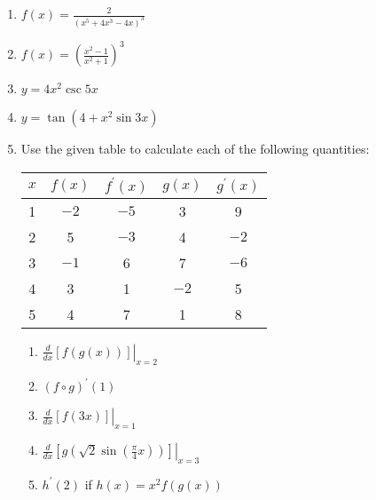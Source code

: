 \documentclass[12pt]{article}
\newif\ifans
\begin{document}
\begin{enumerate}
\item $f(x) = \frac{2}{(x^5+4x^3-4x)^3}$ 

\ifans{\fbox{$\frac{-6(5x^4+12x^2-4)}{(x^5+4x^3-4x)^4}$}} \fi

\item $f(x) = \left(\frac{x^2-1}{x^2+1}\right)^3$ 

\ifans{\fbox{$\frac{12x(x^2-1)^2}{(x^2+1)^4}$}} \fi

\item $y=4x^2\csc{5x}$

\ifans{\fbox{$8x\csc{(5x)}-20x^2\csc{(5x)}\cot{(5x)}$}} \fi

\item $y=\tan{(4+x^2\sin{3x})}$

\ifans{\fbox{$\left(3x^2\cos{3x}+2x\sin{3x}\right)\sec^2{\left(4+x^2\sin{3x}\right)}$}} \fi

\item Use the given table to calculate each of the following quantities:

\begin{center}
\begin{tabular}{c|c|c|c|c}
$x$ & $f(x)$ & $f^{\prime}(x)$ & $g(x)$ & $g^{\prime}(x)$\\
\hline
1 & $-2$ & $-5$ & 3 & 9\\
2& 5 & $-3$ & 4 & $-2$\\
3 & $-1$ & 6  & 7 & $-6$\\
4 & 3 & 1 & $-2$ & 5\\
5 & 4 & 7 & 1 & 8
\end{tabular}
\end{center}

\begin{enumerate}

\item $\left.\frac{d}{dx}[f(g(x))]\right|_{x=2}$

\ifans{\fbox{$-2$}} \fi

\item $(f \circ g)^{\prime}(1)$

\ifans{\fbox{$54$}} \fi

\item $\left.\frac{d}{dx}[f(3x)]\right|_{x=1}$

\ifans{\fbox{$18$}} \fi

\item $\left.\frac{d}{dx}\left[g\left(\sqrt{2}\sin{\left(\frac{\pi}{4}x\right)}\right)\right]\right|_{x=3}$

\ifans{\fbox{$-\frac{9\pi}{4}$}} \fi

\item $h^{\prime}(2)$ if $h(x)=x^2f(g(x))$

\ifans{\fbox{$4$}} \fi

\end{enumerate}

\end{enumerate}
\end{document}
